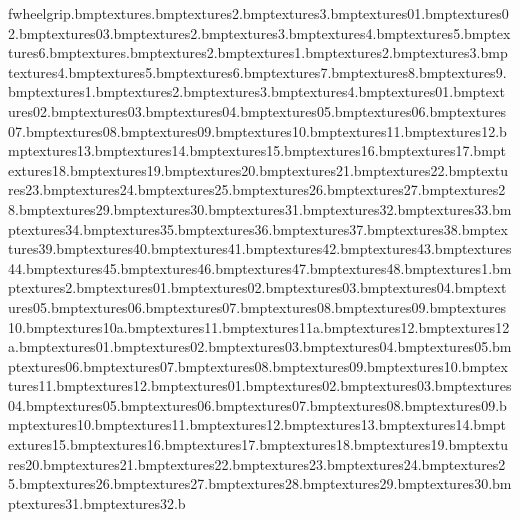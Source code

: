 fwheelgrip.bmp textures\sand.bmp textures\sand2.bmp textures\sand3.bmp textures\sandbeach01.bmp textures\sandbeach02.bmp textures\sandbeach03.bmp textures\sandbed2.bmp textures\sandbed3.bmp textures\sandbed4.bmp textures\sandbed5.bmp textures\sandbed6.bmp textures\sandbedrock.bmp textures\sandbedrock2.bmp textures\sandcastle1.bmp textures\sandcastle2.bmp textures\sandcastle3.bmp textures\sandcastle4.bmp textures\sandcastle5.bmp textures\sandcastle6.bmp textures\sandcastle7.bmp textures\sandcastle8.bmp textures\sandcastle9.bmp textures\sandedge1.bmp textures\sandedge2.bmp textures\sandedge3.bmp textures\sandedge4.bmp textures\sandrock01.bmp textures\sandrock02.bmp textures\sandrock03.bmp textures\sandrock04.bmp textures\sandrock05.bmp textures\sandrock06.bmp textures\sandrock07.bmp textures\sandrock08.bmp textures\sandrock09.bmp textures\sandrock10.bmp textures\sandrock11.bmp textures\sandrock12.bmp textures\sandrock13.bmp textures\sandrock14.bmp textures\sandrock15.bmp textures\sandrock16.bmp textures\sandrock17.bmp textures\sandrock18.bmp textures\sandrock19.bmp textures\sandrock20.bmp textures\sandrock21.bmp textures\sandrock22.bmp textures\sandrock23.bmp textures\sandrock24.bmp textures\sandrock25.bmp textures\sandrock26.bmp textures\sandrock27.bmp textures\sandrock28.bmp textures\sandrock29.bmp textures\sandrock30.bmp textures\sandrock31.bmp textures\sandrock32.bmp textures\sandrock33.bmp textures\sandrock34.bmp textures\sandrock35.bmp textures\sandrock36.bmp textures\sandrock37.bmp textures\sandrock38.bmp textures\sandrock39.bmp textures\sandrock40.bmp textures\sandrock41.bmp textures\sandrock42.bmp textures\sandrock43.bmp textures\sandrock44.bmp textures\sandrock45.bmp textures\sandrock46.bmp textures\sandrock47.bmp textures\sandrock48.bmp textures\sandstep1.bmp textures\sandstep2.bmp textures\sdomestrip01.bmp textures\sdomestrip02.bmp textures\sdomestrip03.bmp textures\sdomestrip04.bmp textures\sdomestrip05.bmp textures\sdomestrip06.bmp textures\sdomestrip07.bmp textures\sdomestrip08.bmp textures\sdomestrip09.bmp textures\sdomestrip10.bmp textures\sdomestrip10a.bmp textures\sdomestrip11.bmp textures\sdomestrip11a.bmp textures\sdomestrip12.bmp textures\sdomestrip12a.bmp textures\sdomestripi01.bmp textures\sdomestripi02.bmp textures\sdomestripi03.bmp textures\sdomestripi04.bmp textures\sdomestripi05.bmp textures\sdomestripi06.bmp textures\sdomestripi07.bmp textures\sdomestripi08.bmp textures\sdomestripi09.bmp textures\sdomestripi10.bmp textures\sdomestripi11.bmp textures\sdomestripi12.bmp textures\sharprock01.bmp textures\sharprock02.bmp textures\sharprock03.bmp textures\sharprock04.bmp textures\sharprock05.bmp textures\sharprock06.bmp textures\sharprock07.bmp textures\sharprock08.bmp textures\sharprock09.bmp textures\sharprock10.bmp textures\sharprock11.bmp textures\sharprock12.bmp textures\sharprock13.bmp textures\sharprock14.bmp textures\sharprock15.bmp textures\sharprock16.bmp textures\sharprock17.bmp textures\sharprock18.bmp textures\sharprock19.bmp textures\sharprock20.bmp textures\sharprock21.bmp textures\sharprock22.bmp textures\sharprock23.bmp textures\sharprock24.bmp textures\sharprock25.bmp textures\sharprock26.bmp textures\sharprock27.bmp textures\sharprock28.bmp textures\sharprock29.bmp textures\sharprock30.bmp textures\sharprock31.bmp textures\sharprock32.b